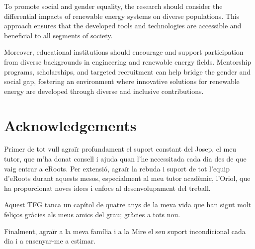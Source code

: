 \documentclass[a4paper,11pt, titlepage, twoside]{article}
\begin{document}
To promote social and gender equality, the research should consider the differential impacts of renewable energy systems on diverse populations. This approach ensures that the developed tools and technologies are accessible and beneficial to all segments of society.

Moreover, educational institutions should encourage and support participation from diverse backgrounds in engineering and renewable energy fields. Mentorship programs, scholarships, and targeted recruitment can help bridge the gender and social gap, fostering an environment where innovative solutions for renewable energy are developed through diverse and inclusive contributions.


\section*{Acknowledgements}

Primer de tot vull agraïr profundament el suport constant del Josep, el meu tutor, que m'ha donat consell i ajuda quan
l'he necessitada cada dia des de que vaig entrar a eRoots. Per extensió, agraïr la rebuda i suport de tot l'equip d'eRoots durant aquests mesos,
especialment al meu tutor acadèmic, l'Oriol, que ha proporcionat noves idees i enfocs al desenvolupament del treball.\par

Aquest TFG tanca un capítol de quatre anys de la meva vida que han sigut molt feliços gràcies als meus amics del grau; gràcies a tots nou.\par 
Finalment, agraïr a la meva família i a la Mire el seu suport incondicional cada dia i a ensenyar-me a estimar.
 
\end{document}
